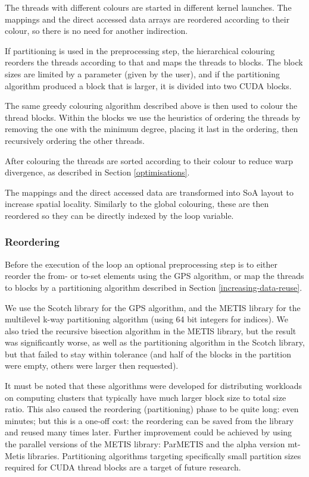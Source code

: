 The threads with different colours are started in different kernel launches. The
mappings and the direct accessed data arrays are reordered according to their
colour, so there is no need for another indirection.

If partitioning is used in the preprocessing step, the hierarchical colouring
reorders the threads according to that and maps the threads to blocks. The block
sizes are limited by a parameter (given by the user), and if the partitioning
algorithm produced a block that is larger, it is divided into two CUDA blocks.

The same greedy colouring algorithm described above is then used to colour the
thread blocks. Within the blocks we use the heuristics of ordering the threads
by removing the one with the minimum degree, placing it last in the ordering,
then recursively ordering the other threads.

After colouring the threads are sorted according to their colour to reduce warp
divergence, as described in Section \ref{optimisations}.

The mappings and the direct accessed data are transformed into SoA layout to
increase spatial locality. Similarly to the global colouring, these are then
reordered so they can be directly indexed by the loop variable.

\subsubsection{Reordering}

Before the execution of the loop an optional preprocessing step is to either
reorder the from- or to-set elements using the GPS algorithm, or map the threads
to blocks by a partitioning algorithm described in Section
\ref{increasing-data-reuse}.

We use the Scotch library\cite{scotch} for the GPS algorithm, and the
METIS\cite{metis} library for the multilevel k-way partitioning algorithm (using
64 bit integers for indices). We also tried the recursive bisection algorithm in
the METIS library, but the result was significantly worse, as well as the
partitioning algorithm in the Scotch library, but that failed to stay within
tolerance (and half of the blocks in the partition were empty, others were
larger then requested).

It must be noted that these algorithms were developed for distributing workloads
on computing clusters that typically have much larger block size to total size
ratio. This also caused the reordering (partitioning) phase to be quite long:
even minutes; but this is a one-off cost: the reordering can be saved from the
library and reused many times later. Further improvement could be achieved by
using the parallel versions of the METIS library: ParMETIS\cite{parmetis} and
the alpha version mt-Metis\cite{mtmetis} libraries. Partitioning algorithms
targeting specifically small partition sizes required for CUDA thread blocks are
a target of future research.

